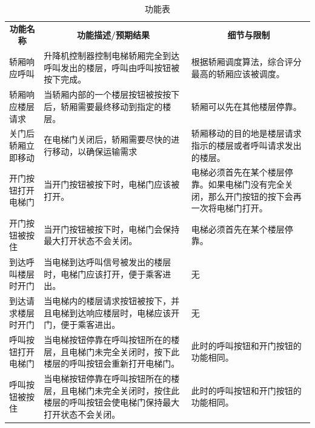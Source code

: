 \begin{longtable}{p{} p{} p{}}
	\caption{功能表}\\

	\toprule
	\multicolumn{1}{c}{\textbf{功能名称}} &
	\multicolumn{1}{c}{\textbf{功能描述/预期结果}} &
	\multicolumn{1}{c}{\textbf{细节与限制}} \\
	\cmidrule(lr){1-1} \cmidrule(lr){2-2} \cmidrule(lr){3-3}

	轿厢响应呼叫
	& 升降机控制器控制电梯轿厢完全到达呼叫发出的楼层，呼叫由呼叫按钮被按下完成。
	& 根据轿厢调度算法，综合评分最高的轿厢应该被调度。 \\ \cmidrule(lr){1-3}

	轿厢响应楼层请求
	& 当轿厢内部的一个楼层按钮被按按下后，轿厢需要最终移动到指定的楼层。
	& 轿厢可以先在其他楼层停靠。 \\ \cmidrule(lr){1-3}

	关门后轿厢立即移动
	& 在电梯门关闭后，轿厢需要尽快的进行移动，以确保运输需求
	& 轿厢移动的目的地是楼层请求指示的楼层或者呼叫请求发出的楼层。 \\ \cmidrule(lr){1-3}

	开门按钮打开电梯门
	& 当开门按钮被按下时，电梯门应该被打开。
	& 电梯必须首先在某个楼层停靠。如果电梯门没有完全关闭，那么开门按钮的按下会再一次将电梯门打开。 \\ \cmidrule(lr){1-3}

	开门按钮被按住
	& 当开门按钮被按下时，电梯门会保持最大打开状态不会关闭。
	& 电梯必须首先在某个楼层停靠。 \\ \cmidrule(lr){1-3}

	到达呼叫楼层时开门
	& 当电梯到达呼叫信号被发出的楼层时，电梯门应该打开，便于乘客进出。
	& 无 \\ \cmidrule(lr){1-3}

	到达请求楼层时开门
	& 当电梯内的楼层请求按钮被按下，并且电梯到达响应楼层时，电梯应该开门，便于乘客进出。
	& 无 \\ \cmidrule(lr){1-3}

	呼叫按钮打开电梯门
	& 当电梯按钮停靠在呼叫按钮所在的楼层，且电梯门未完全关闭时，按下此楼层的呼叫按钮会重新打开电梯门。
	& 此时的呼叫按钮和开门按钮的功能相同。 \\ \cmidrule(lr){1-3}

	呼叫按钮被按住
	& 当电梯按钮停靠在呼叫按钮所在的楼层，且电梯门未完全关闭时，按住此楼层的呼叫按钮会使电梯门保持最大打开状态不会关闭。
	& 此时的呼叫按钮和开门按钮的功能相同。 \\ \cmidrule(lr){1-3}


\end{longtable}
